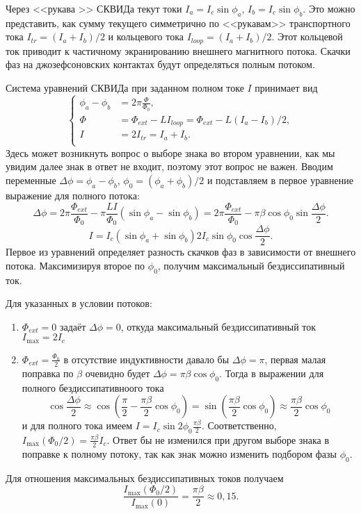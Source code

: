 \documentclass[a4paper]{article}
\begin{document}
\begin{sol}
Через <<рукава >> СКВИДа текут токи $I_a=I_c \sin \phi_a$,
$I_b= I_c \sin \phi_b$. Это можно представить,
как сумму текущего симметрично по <<рукавам>> транспортного
тока $I_{tr }= (I_a +I_b) /2$ и кольцевого тока $I_{loop}= (I_a+I_b) /2$. Этот кольцевой ток приводит к частичному экранированию
 внешнего магнитного потока. Скачки фаз на джозефсоновских
контактах будут определяться полным потоком.

Система уравнений СКВИДа при заданном полном токе $I$ принимает вид
\[
\left\{
\begin{aligned}
\phi_a- \phi_b &= 2\pi \frac{\Phi}{\Phi_0} ,\\
\Phi&=\Phi_{ext}-L I_{loop}= \Phi_{ext}-L(I_a-I_b) /2 ,\\
I&=2I_{t r}= I_a+I_b .\\
\end{aligned}
\right.
\] 
Здесь может возникнуть вопрос о выборе знака во втором уравнении,
как мы увидим далее знак в ответ не входит, поэтому этот вопрос
не важен. Вводим переменные $\Delta \phi= \phi_a- \phi_b$,
$\phi_0= \left( \phi_a+ \phi_b \right) /2$ и подставляем в первое
уравнение выражение для полного потока:
\[
\Delta \phi= 2\pi \frac{\Phi_{ext}}{\Phi_0}-\pi
\frac{LI}{\Phi_0}\left( \sin \phi_a-\sin \phi_b \right) =
2\pi \frac{\Phi _{ext}}{\Phi_0}- \pi \beta \cos  \phi_0
\sin  \frac{\Delta \phi}{2}
.\] 
\[
	I=I_c (\sin \phi_a+ \sin \phi_b) 2I_c \sin 
	\phi_0 \cos  \frac{\Delta \phi}{2}
.\] 
Первое из уравнений определяет разность скачков фаз в зависимости
от внешнего потока. Максимизируя второе по $\phi_0$, получим
максимальный бездиссипативный ток.

Для указанных в условии потоков:
\begin{enumerate}
	\item $\Phi_{ext}=0$ задаёт $\Delta \phi =0$,
		откуда максимальный бездиссипативный ток
		$I_{\max}= 2I_c$ 
	\item $\Phi_{ext}= \frac{\Phi_0}{2}$ в отсутствие 
		индуктивности давало бы $\Delta \phi=\pi$, первая
		малая поправка по $\beta$ очевидно будет
$\Delta \phi= \pi\beta \cos \phi_0$. Тогда в выражении для
полного бездиссипативноого тока
\[
\cos  \frac{\Delta \phi}{2}\approx
\cos  \left( \frac{\pi}{2} - \frac{\pi \beta}{2}
\cos \phi_0 \right) = \sin 
\left( \frac{\pi\beta}{2} \cos \phi_0 \right) \approx
\frac{\pi \beta}{2} \cos  \phi_0
\] 
и для полного тока имеем $I=I_c \sin 2\phi_0 \frac{\pi \beta}{2}$.
Соответственно, $I_{\max} (\Phi_0 /2)= \frac{\pi\beta}{2}I_c$.
Ответ бы не изменился при другом выборе знака в поправке к полному
потоку, так как знак можно изменить подбором фазы
$\phi_0$. 
\end{enumerate}
Для отношения максимальных бездиссипативных токов получаем
\[
	\frac{I_{\max}(\Phi_0 /2)}{I_{\max}(0)}= \frac{\pi \beta}{2}
	\approx 0,15
.\] 
\end{sol}
\end{document}
